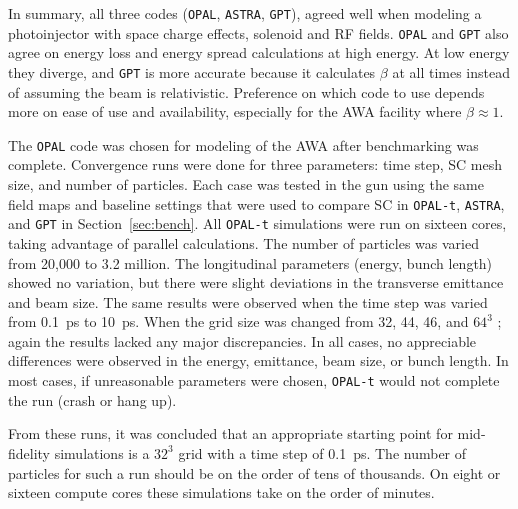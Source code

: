 In summary, all three codes (\verb|OPAL|, \verb|ASTRA|, \verb|GPT|), agreed well when modeling a photoinjector
with space charge effects, solenoid and RF fields.
\verb|OPAL| and \verb|GPT| also agree on energy loss and energy spread calculations at high energy.
At low energy they diverge, and \verb|GPT| is more accurate because it calculates 
$\beta$ at all times instead of assuming the beam is relativistic.
Preference on which code to use depends more on ease of use 
and availability, especially for the AWA facility where $\beta\approx 1$. 


The \verb|OPAL| code was chosen for modeling of the AWA after benchmarking was complete.
Convergence runs were done for three parameters: 
time step, SC mesh size, and number of particles.  
Each case was tested in the gun using the same field maps and 
baseline settings that were used to compare SC in \verb|OPAL-t|,  
\verb|ASTRA|, and \verb|GPT| in Section~\ref{sec:bench}. 
All \verb|OPAL-t| simulations were run on 
sixteen cores, taking advantage of parallel calculations. 
The number of particles was varied from 20,000 to 3.2 million.  
The longitudinal parameters (energy,  bunch length)  
showed no variation, but there were slight deviations 
in the transverse emittance and beam size. The same results 
were observed when the time step was varied from \SI{0.1}{ps} to \SI{10}{ps}.  
When the grid size was changed from 32, 44, 46, and $64^3$ ; 
again the results lacked any major discrepancies.  
In all cases, no appreciable differences were observed in the energy,
emittance, beam size, or bunch length. In  most  cases,  
if unreasonable  parameters  were chosen, 
\verb|OPAL-t| would not complete the run (crash or hang up).  

From these runs, it was concluded that an appropriate starting point 
for mid-fidelity simulations is a $32^3$  grid with a time step
of \SI{0.1}{ps}. The number of particles for such a run should be on the
order of tens of thousands. On eight or sixteen compute cores
these simulations take on the order of minutes.


